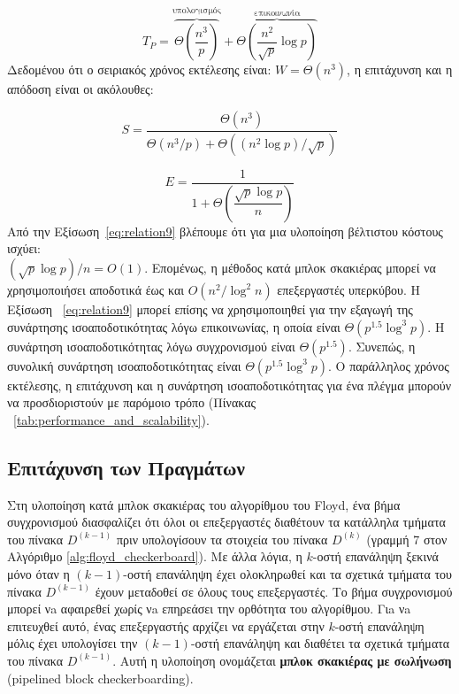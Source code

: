 \documentclass[12pt,a4paper]{article}
\begin{document}
\[
T_P = \overbrace{\Theta\left(\frac{n^3}{p}\right)}^{\text{υπολογισμός}} 
+ \overbrace{\Theta\left(\frac{n^2}{\sqrt{p}} \log p \right)}^{\text{επικοινωνία}}
\]
Δεδομένου ότι ο σειριακός χρόνος εκτέλεσης είναι: $W = \Theta(n^3)$, η επιτάχυνση και η απόδοση είναι οι ακόλουθες:

\[
S = \frac{\Theta(n^3)}{\Theta(n^3/p) + \Theta\left({(n^2 \log p)}/{\sqrt{p}}\right)}
\]

\begin{equation}
E = \frac{1}{1 + \Theta\left(\dfrac{\sqrt{p} \log p}{n}\right)}
\label{eq:relation9}
\end{equation}Από την Εξίσωση~\ref{eq:relation9} βλέπουμε ότι για μια υλοποίηση βέλτιστου κόστους ισχύει:\\
$(\sqrt{p} \log p) / n = O(1)$.
Επομένως, η μέθοδος κατά μπλοκ σκακιέρας μπορεί να χρησιμοποιήσει αποδοτικά έως και $O\left({n^2}/{\log^2 n}\right)$ επεξεργαστές υπερκύβου.
Η Εξίσωση ~\ref{eq:relation9}  μπορεί επίσης να χρησιμοποιηθεί για την εξαγωγή της συνάρτησης ισοαποδοτικότητας λόγω επικοινωνίας, η οποία είναι $\Theta(p^{1.5} \log^3 p)$.
Η συνάρτηση ισοαποδοτικότητας λόγω συγχρονισμού είναι $\Theta(p^{1.5})$.
Συνεπώς, η συνολική συνάρτηση ισοαποδοτικότητας είναι $\Theta(p^{1.5} \log^3 p)$.
Ο παράλληλος χρόνος εκτέλεσης, η επιτάχυνση και η συνάρτηση ισοαποδοτικότητας για ένα πλέγμα μπορούν να προσδιοριστούν με παρόμοιο τρόπο (Πίνακας ~\ref{tab:performance_and_scalability}).

\subsection*{Επιτάχυνση των Πραγμάτων}
Στη υλοποίηση κατά μπλοκ σκακιέρας του αλγορίθμου του \foreignlanguage{english}{Floyd}, ένα βήμα συγχρονισμού διασφαλίζει ότι όλοι οι επεξεργαστές διαθέτουν τα κατάλληλα τμήματα του πίνακα $D^{(k-1)}$ πριν υπολογίσουν τα στοιχεία του πίνακα $D^{(k)}$ (γραμμή 7 στον Αλγόριθμο \ref{alg:floyd_checkerboard}). Με άλλα λόγια, η $k$-οστή επανάληψη ξεκινά μόνο όταν η $(k-1)$-οστή επανάληψη έχει ολοκληρωθεί και τα σχετικά τμήματα του πίνακα $D^{(k-1)}$ έχουν μεταδοθεί σε όλους τους επεξεργαστές. Το βήμα συγχρονισμού μπορεί νa αφαιρεθεί χωρίς νa επηρεάσει την ορθότητα του αλγορίθμου. Γιa νa επιτευχθεί αυτό, 
ένας επεξεργαστής αρχίζει να εργάζεται στην $k$-οστή επανάληψη μόλις έχει υπολογίσει την $(k-1)$-οστή επανάληψη και διαθέτει τα σχετικά τμήματα του πίνακα $D^{(k-1)}$. Αυτή η υλοποίηση ονομάζεται \textbf{μπλοκ σκακιέρας με σωλήνωση} (\foreignlanguage{english}{pipelined block checkerboarding}). 
\end{document}
